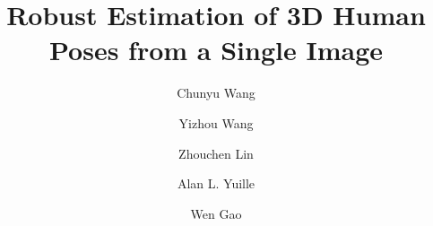 \documentclass[10pt,twocolumn,letterpaper]{article}
\begin{document}
\def\memonumber{ \textsf{013}} \def\memodate{\textsf{\today}} \def\memotitle{\textsf{Robust Estimation of 3D Human Poses from a Single Image}} \def\memoauthors{\textsf{Chunyu Wang$^{1}$,Yizhou Wang$^{1}$,Zhouchen Lin$^{1}$,Alan L. Yuille$^{2}$,Wen Gao$^{1}$}\\
$^{1}$Peking University, Beijing, China~~
$^{2}$University of California, Los Angeles\\
{\tt\small \{wangchunyu,yizhou.wang, zlin\}@pku.edu.cn~@yuille@stat.ucla.edu~wgao@pku.edu.cn}}

\def\memoabstract{\textsf{Human pose estimation is a key step to action recognition. We propose a method of estimating 3D human poses from a single image, which works in conjunction with an existing 2D pose/joint detector. 3D pose estimation is challenging because multiple 3D poses may correspond to the same 2D pose after projection due to the lack of depth information. Moreover, current 2D pose estimators are usually inaccurate which may cause errors in the 3D estimation. We address the challenges in three ways: (i) We represent a 3D pose as a linear combination of a sparse set of bases learned from 3D human skeletons. (ii) We enforce limb length constraints to eliminate anthropomorphically implausible skeletons. (iii) We estimate a 3D pose by minimizing the $L_1$-norm error between the projection of the 3D pose and the corresponding 2D detection. The $L_1$-norm loss term is robust to inaccurate 2D joint estimations. We use the alternating direction method (ADM) to solve the optimization problem efficiently. Our approach outperforms the state-of-the-arts on three benchmark datasets.}}

\titleAT 

\newpage
\twocolumn

\title{Robust Estimation of 3D Human Poses from a Single Image}

\author[1,2]{Chunyu Wang}
\author[1,2]{Yizhou Wang}
\author[2]{Zhouchen Lin}
\author[3]{Alan L. Yuille}
\author[1]{Wen Gao}

\maketitle
\end{document}
